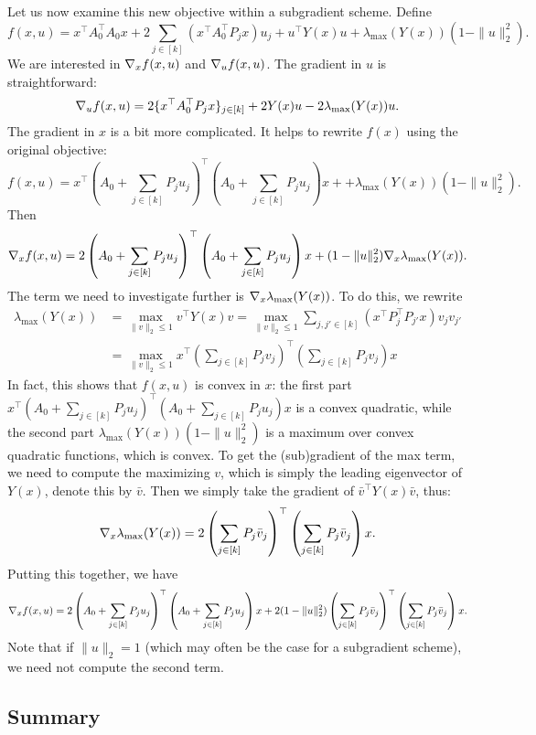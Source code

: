 \documentclass[11pt,oneside]{article}
\theoremstyle{plain}
\theoremstyle{definition}
\theoremstyle{remark}
\begin{document}
Let us now examine this new objective within a subgradient scheme. Define
\[ f(x,u) = x^\top A_0^\top A_0 x + 2 \sum_{j \in [k]} (x^\top A_0^\top P_j x) u_j + u^\top Y(x) u + \lambda_{\max}(Y(x))(1 - \|u\|_2^2). \]
We are interested in $\nabla_x f(x,u)$ and $\nabla_u f(x,u)$. The gradient in $u$ is straightforward:
\[ \nabla_u f(x,u) = 2 \{x^\top A_0^\top P_j x\}_{j \in [k]} + 2 Y(x) u - 2 \lambda_{\max}(Y(x)) u. \]
The gradient in $x$ is a bit more complicated. It helps to rewrite $f(x)$ using the original objective:
\[ f(x,u) = x^\top \left( A_0 + \sum_{j \in [k]} P_j u_j \right)^\top \left( A_0 + \sum_{j \in [k]} P_j u_j \right) x + + \lambda_{\max}(Y(x))(1 - \|u\|_2^2). \]
Then
\[ \nabla_x f(x,u) = 2 \left( A_0 + \sum_{j \in [k]} P_j u_j \right)^\top \left( A_0 + \sum_{j \in [k]} P_j u_j \right) x + (1 - \|u\|_2^2) \nabla_x \lambda_{\max}(Y(x)). \]
The term we need to investigate further is $\nabla_x \lambda_{\max}(Y(x))$. To do this, we rewrite
\begin{align*}
\lambda_{\max}(Y(x)) &= \max_{\|v\|_2 \leq 1} v^\top Y(x) v = \max_{\|v\|_2 \leq 1} \sum_{j,j' \in [k]} \left(x^\top P_j^\top P_{j'} x\right) v_j v_{j'}\\
&= \max_{\|v\|_2 \leq 1} x^\top \left( \sum_{j \in [k]} P_j v_j \right)^\top \left( \sum_{j \in [k]} P_j v_j \right) x
\end{align*}
In fact, this shows that $f(x,u)$ is convex in $x$: the first part $x^\top \left( A_0 + \sum_{j \in [k]} P_j u_j \right)^\top \left( A_0 + \sum_{j \in [k]} P_j u_j \right) x$ is a convex quadratic, while the second part $\lambda_{\max}(Y(x))(1 - \|u\|_2^2)$ is a maximum over convex quadratic functions, which is convex. To get the (sub)gradient of the max term, we need to compute the maximizing $v$, which is simply the leading eigenvector of $Y(x)$, denote this by $\bar{v}$. Then we simply take the gradient of $\bar{v}^\top Y(x) \bar{v}$, thus:
\[ \nabla_x \lambda_{\max}(Y(x)) = 2 \left( \sum_{j \in [k]} P_j \bar{v}_j \right)^\top \left( \sum_{j \in [k]} P_j \bar{v}_j \right) x. \]
Putting this together, we have
\[ \nabla_x f(x,u) = 2 \left( A_0 + \sum_{j \in [k]} P_j u_j \right)^\top \left( A_0 + \sum_{j \in [k]} P_j u_j \right) x + 2 (1 - \|u\|_2^2) \left( \sum_{j \in [k]} P_j \bar{v}_j \right)^\top \left( \sum_{j \in [k]} P_j \bar{v}_j \right) x. \]
Note that if $\|u\|_2 = 1$ (which may often be the case for a subgradient scheme), we need not compute the second term.


\subsection{Summary}
\end{document}
